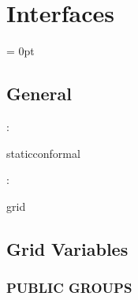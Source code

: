 
\section{Interfaces} 


\parskip = 0pt

\vspace{3mm} \subsection*{General}

: 

staticconformal
\vspace{2mm}

: 

grid
\vspace{2mm}
\subsection*{Grid Variables}
\vspace{5mm}\subsubsection{PUBLIC GROUPS}

\vspace{5mm}

